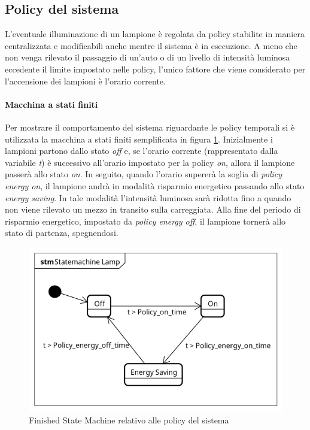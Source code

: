 \subsection{Policy del sistema}
L'eventuale illuminazione di un lampione è regolata da policy stabilite in maniera centralizzata e modificabili anche mentre il sistema è in esecuzione.
A meno che non venga rilevato il passaggio di un'auto o di un livello di intensità luminosa eccedente il limite impostato nelle policy, l'unico fattore che viene considerato per l'accensione dei lampioni è l'orario corrente.
\paragraph{Macchina a stati finiti}
Per mostrare il comportamento del sistema riguardante le policy temporali si è utilizzata la macchina a stati finiti semplificata in figura \ref{FSM POLICY}.
Inizialmente i lampioni partono dallo stato \textit{off} e, se l'orario corrente (rappresentato dalla variabile \textit{t}) è successivo all'orario impostato per la policy \textit{on}, allora il lampione passerà allo stato \textit{on}.
In seguito, quando l'orario supererà la soglia di \textit{policy energy on}, il lampione andrà in modalità risparmio energetico passando allo stato \textit{energy saving}.
In tale modalità l'intensità luminosa sarà ridotta fino a quando non viene rilevato un mezzo in transito sulla carreggiata.
Alla fine del periodo di risparmio energetico, impostato da \textit{policy energy off}, il lampione tornerà allo stato di partenza, spegnendosi.
\begin{figure}[ht]
	\centering
	\includegraphics[scale=.8]{figure/Statemachine_Lamp.png}
	\caption{Finished State Machine relativo alle policy del sistema \label{FSM POLICY}}
\end{figure}

